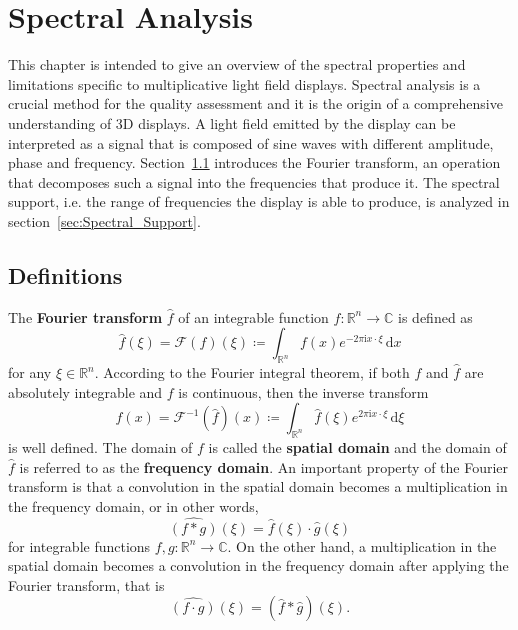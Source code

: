\chapter{Spectral Analysis}


This chapter is intended to give an overview of the spectral properties and limitations specific to multiplicative light field displays.
Spectral analysis is a crucial method for the quality assessment and it is the origin of a comprehensive understanding of 3D displays. 
A light field emitted by the display can be interpreted as a signal that is composed of sine waves with different amplitude, phase and frequency.
Section~\ref{sec:Definitions} introduces the Fourier transform, an operation that decomposes such a signal into the frequencies that produce it.
The spectral support, i.e. the range of frequencies the display is able to produce, is analyzed in section~\ref{sec:Spectral_Support}. 

\section{Definitions}
\label{sec:Definitions}

The \textbf{Fourier transform} $\hat{f}$ of an integrable function $f \colon \mathbb{R}^n \to \mathbb{C}$ is defined as 
\begin{equation}
	\hat{f}(\xi) = \mathcal{F}(f)(\xi) \coloneqq \int_{\mathbb{R}^n} f(x) e^{-2 \pi \mathrm{i} x \cdot \xi} \, \mathrm{d}x
\end{equation}
for any $\xi \in \mathbb{R}^n$. 
According to the Fourier integral theorem, if both $f$ and $\hat{f}$ are absolutely integrable and $f$ is continuous, then the inverse transform 
\begin{equation}
	f(x) = \mathcal{F}^{-1}(\hat{f})(x) \coloneqq \int_{\mathbb{R}^n} \hat{f}(\xi) e^{2 \pi \mathrm{i} x \cdot \xi} \, \mathrm{d}\xi
\end{equation}
is well defined.
The domain of $f$ is called the \textbf{spatial domain} and the domain of $\hat{f}$ is referred to as the \textbf{frequency domain}.
An important property of the Fourier transform is that a convolution in the spatial domain becomes a multiplication in the frequency domain, or in other words, 
\begin{equation}
	\widehat{(f \ast g)}(\xi) = \hat{f}(\xi) \cdot \hat{g}(\xi)
\end{equation}
for integrable functions $f, g \colon \mathbb{R}^n \to \mathbb{C}$.
On the other hand, a multiplication in the spatial domain becomes a convolution in the frequency domain after applying the Fourier transform, that is
\begin{equation}
	\widehat{(f \cdot g)}(\xi) = (\hat{f} \ast \hat{g})(\xi).
\end{equation}

